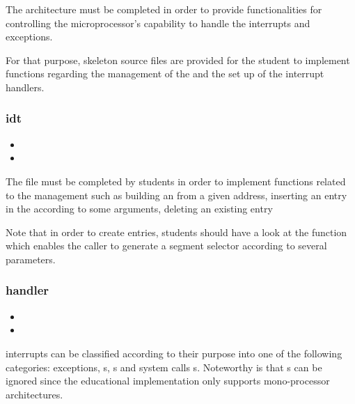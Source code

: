 The architecture must be completed in order to provide functionalities for
controlling the microprocessor's capability to handle the interrupts and
exceptions.

For that purpose, skeleton source files are provided for the student to
implement functions regarding the management of the  and the set up of the interrupt handlers.

\subsubsection*{idt}

\begin{itemize}
  \item
  \item
\end{itemize}

The file  must be completed by students in order to
implement functions related to the  management such as building
an  from a given address, inserting an entry in the 
according to some arguments, deleting an existing  entry \etc{}

Note that in order to create  entries, students should have a look
at the function  which enables the
caller to generate a segment selector according to several parameters.

\subsubsection*{handler}

\begin{itemize}
  \item
  \item
\end{itemize}

 interrupts can be classified according to their purpose into
one of the following categories: exceptions, s,
s and system calls \aka{}
s. Noteworthy is that s can be ignored since the
educational implementation only supports mono-processor architectures.

